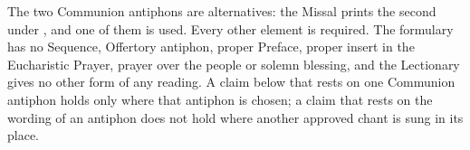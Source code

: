 \noindent The two Communion antiphons are alternatives: the Missal prints the
second under , and one of them is used. Every other element is
required. The formulary has no Sequence, Offertory antiphon, proper Preface,
proper insert in the Eucharistic Prayer, prayer over the people or solemn
blessing, and the Lectionary gives no other form of any reading. A claim below
that rests on one Communion antiphon holds only where that antiphon is chosen;
a claim that rests on the wording of an antiphon does not hold where another
approved chant is sung in its place.
